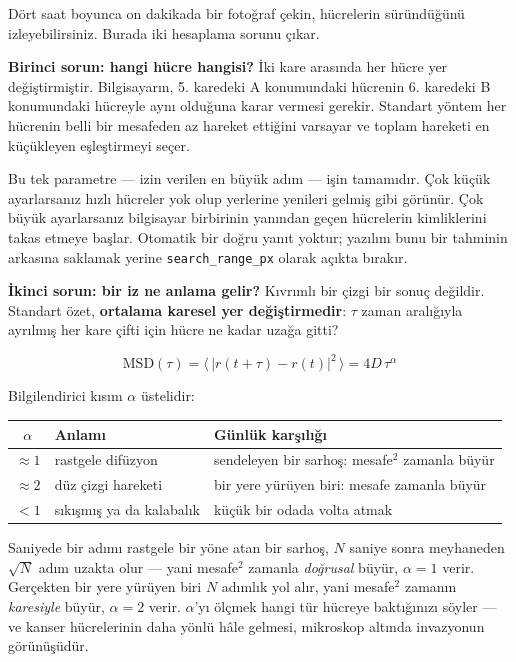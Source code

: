 \documentclass[11pt,a4paper]{article}
\begin{document}
Dört saat boyunca on dakikada bir fotoğraf çekin, hücrelerin süründüğünü
izleyebilirsiniz. Burada iki hesaplama sorunu çıkar.

\textbf{Birinci sorun: hangi hücre hangisi?} İki kare arasında her hücre yer
değiştirmiştir. Bilgisayarın, 5. karedeki A konumundaki hücrenin 6. karedeki B
konumundaki hücreyle aynı olduğuna karar vermesi gerekir. Standart yöntem her
hücrenin belli bir mesafeden az hareket ettiğini varsayar ve toplam hareketi en
küçükleyen eşleştirmeyi seçer.

\begin{warnbox}
Bu tek parametre --- izin verilen en büyük adım --- işin tamamıdır. Çok küçük
ayarlarsanız hızlı hücreler yok olup yerlerine yenileri gelmiş gibi görünür. Çok
büyük ayarlarsanız bilgisayar birbirinin yanından geçen hücrelerin kimliklerini
takas etmeye başlar. Otomatik bir doğru yanıt yoktur; yazılım bunu bir tahminin
arkasına saklamak yerine \texttt{search\_range\_px} olarak açıkta bırakır.
\end{warnbox}

\textbf{İkinci sorun: bir iz ne anlama gelir?} Kıvrımlı bir çizgi bir sonuç
değildir. Standart özet, \textbf{ortalama karesel yer değiştirmedir}: $\tau$
zaman aralığıyla ayrılmış her kare çifti için hücre ne kadar uzağa gitti?

\begin{equation}
\mathrm{MSD}(\tau)=\big\langle\,|r(t+\tau)-r(t)|^2\,\big\rangle = 4D\,\tau^{\alpha}
\end{equation}

Bilgilendirici kısım $\alpha$ üstelidir:

\begin{center}\small
\begin{tabular}{cll}
\toprule
$\alpha$ & \textbf{Anlamı} & \textbf{Günlük karşılığı} \\
\midrule
$\approx 1$ & rastgele difüzyon & sendeleyen bir sarhoş: mesafe$^2$ zamanla büyür \\
$\approx 2$ & düz çizgi hareketi & bir yere yürüyen biri: mesafe zamanla büyür \\
$<1$ & sıkışmış ya da kalabalık & küçük bir odada volta atmak \\
\bottomrule
\end{tabular}
\end{center}

\begin{plain}
Saniyede bir adımı rastgele bir yöne atan bir sarhoş, $N$ saniye sonra
meyhaneden $\sqrt{N}$ adım uzakta olur --- yani mesafe$^2$ zamanla
\emph{doğrusal} büyür, $\alpha=1$ verir. Gerçekten bir yere yürüyen biri $N$
adımlık yol alır, yani mesafe$^2$ zamanın \emph{karesiyle} büyür, $\alpha=2$
verir. $\alpha$'yı ölçmek hangi tür hücreye baktığınızı söyler --- ve kanser
hücrelerinin daha yönlü hâle gelmesi, mikroskop altında invazyonun görünüşüdür.
\end{plain}
\end{document}

